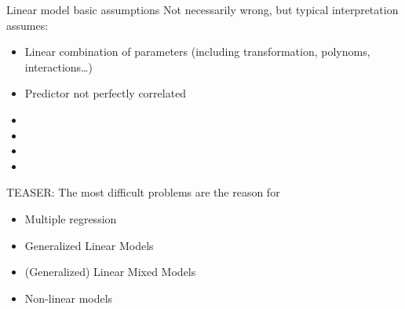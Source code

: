 \documentclass[10pt]{beamer}\usepackage[]{graphicx}\usepackage[]{color}
\begin{document}
%   




\begin{frame}{Linear model basic assumptions}
Not necessarily wrong, but typical interpretation assumes:
 \begin{block}{}
     \begin{itemize}
      \item Linear combination of parameters (including transformation, polynoms, interactions\dots)
      \item Predictor not perfectly correlated 
       \item {\color{red!20!black}{Measurement error in predictors}}
       \item {\color{red!50!black}{Gaussian error distribution}}
       \item {\color{red!70!black}{Homoscedasticity (constant error variance)}}
       \item {\color{red!99!black}{Independence of error}}
     \end{itemize}
 \end{block}
 
 \pause
 \begin{exampleblock}{TEASER: The most difficult problems are the reason for}
  \begin{itemize}[<+->]
    \item Multiple regression
    \item Generalized Linear Models
    \item (Generalized) Linear Mixed Models
    \item Non-linear models
  \end{itemize}
 \end{exampleblock}
\end{frame}
\end{document}
